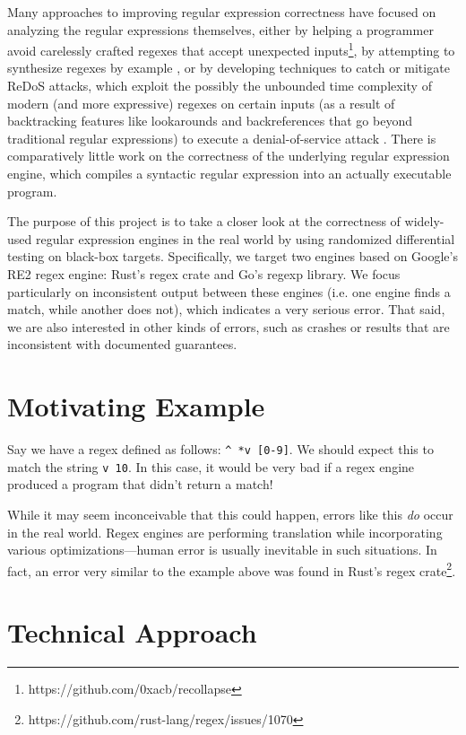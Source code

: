 \documentclass[acmsmall,nonacm,screen]{acmart}
\begin{document}
Many approaches to improving regular expression correctness have focused on analyzing the regular expressions themselves, either by helping a programmer avoid carelessly crafted regexes that accept unexpected inputs\footnote{https://github.com/0xacb/recollapse}, by attempting to synthesize regexes by example \cite{chen2020multi}, or by developing techniques to catch or mitigate ReDoS attacks, which exploit the possibly the unbounded time complexity of modern (and more expressive) regexes on certain inputs (as a result of backtracking features like lookarounds and backreferences that go beyond traditional regular expressions) to execute a denial-of-service attack \cite{mclaughlin2022regulator, shen2018rescue}. There is comparatively little work on the correctness of the underlying regular expression engine, which compiles a syntactic regular expression into an actually executable program.

The purpose of this project is to take a closer look at the correctness of widely-used regular expression engines in the real world by using randomized differential testing on black-box targets.  Specifically, we target two engines based on Google's RE2 regex engine: Rust's regex crate and Go's regexp library. We focus particularly on inconsistent output between these engines (i.e. one engine finds a match, while another does not), which indicates a very serious error. That said, we are also interested in other kinds of errors, such as crashes or results that are inconsistent with documented guarantees.

\section{Motivating Example}
Say we have a regex defined as follows: \texttt{\^{} *v [0-9]}. We should expect this to match the string \texttt{v 10}. In this case, it would be very bad if a regex engine produced a program that didn't return a match!

While it may seem inconceivable that this could happen, errors like this \textit{do} occur in the real world. Regex engines are performing translation while incorporating various optimizations—human error is usually inevitable in such situations. In fact, an error very similar to the example above was found in Rust's regex crate\footnote{https://github.com/rust-lang/regex/issues/1070}.

\section{Technical Approach}
\end{document}
